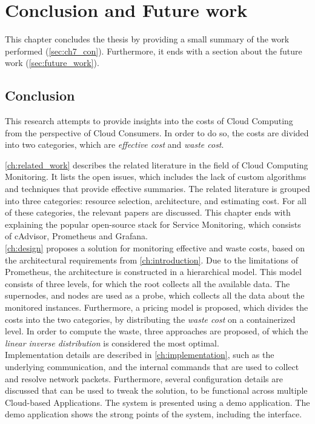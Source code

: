 \chapter{Conclusion and Future work}\label{ch:conclusion}
This chapter concludes the thesis by providing a small summary of the work performed (\autoref{sec:ch7_con}). Furthermore, it ends with a section about the future work (\autoref{sec:future_work}).

\section{Conclusion} \label{sec:ch7_con}
This research attempts to provide insights into the costs of Cloud Computing from the perspective of Cloud Consumers. In order to do so, the costs are divided into two categories, which are \textit{effective cost} and \textit{waste cost}.

\noindent
\autoref{ch:related_work} describes the related literature in the field of Cloud Computing Monitoring. It lists the open issues, which includes the lack of custom algorithms and techniques that provide effective summaries. The related literature is grouped into three categories: resource selection, architecture, and estimating cost. For all of these categories, the relevant papers are discussed. This chapter ends with explaining the popular open-source stack for Service Monitoring, which consists of cAdvisor, Prometheus and Grafana.\\

\noindent
\autoref{ch:design} proposes a solution for monitoring effective and waste costs, based on the architectural requirements from \autoref{ch:introduction}. Due to the limitations of Prometheus, the architecture is constructed in a hierarchical model. This model consists of three levels, for which the root collects all the available data. The supernodes, and nodes are used as a probe, which collects all the data about the monitored instances. Furthermore, a pricing model is proposed, which divides the costs into the two categories, by distributing the \textit{waste cost} on a containerized level. In order to compute the waste, three approaches are proposed, of which the \textit{linear inverse distribution} is considered the most optimal.\\

\noindent
Implementation details are described in \autoref{ch:implementation}, such as the underlying communication, and the internal commands that are used to collect and resolve network packets. Furthermore, several configuration details are discussed that can be used to tweak the solution, to be functional across multiple Cloud-based Applications. The system is presented using a demo application. The demo application shows the strong points of the system, including the interface.\\

